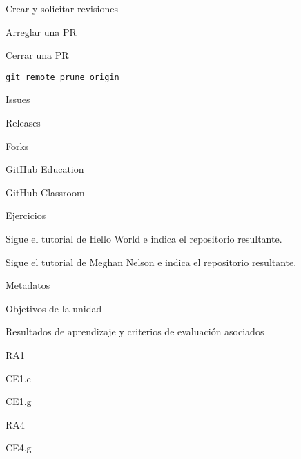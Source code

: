 \begin{longenum}
\begin{longenum}
\begin{longenum}
\begin{longenum}
                \begin{longenum}
                    \item Crear y solicitar revisiones
                \end{longenum}
                \item Arreglar una PR
                \item Cerrar una PR
                \begin{longenum}
                    \item \texttt{git remote prune origin}
                \end{longenum}
            \end{longenum}
            \item Issues
            \item Releases
            \item Forks
            \item GitHub Education
            \begin{longenum}
                \item GitHub Classroom
            \end{longenum}
        \end{longenum}
        \item Ejercicios
        \begin{longenum}
            \item Sigue el tutorial de Hello World e indica el repositorio resultante.
            \item Sigue el tutorial de Meghan Nelson e indica el repositorio resultante.
        \end{longenum}
        \item Metadatos
        \begin{longenum}
            \item Objetivos de la unidad
            \item Resultados de aprendizaje y criterios de evaluación asociados
            \begin{longenum}
                \item RA1
                \begin{longenum}
                    \item CE1.e
                    \item CE1.g
                \end{longenum}
                \item RA4
                \begin{longenum}
                    \item CE4.g

\end{longenum}
\end{longenum}
\end{longenum}
\end{longenum}
\end{longenum}
